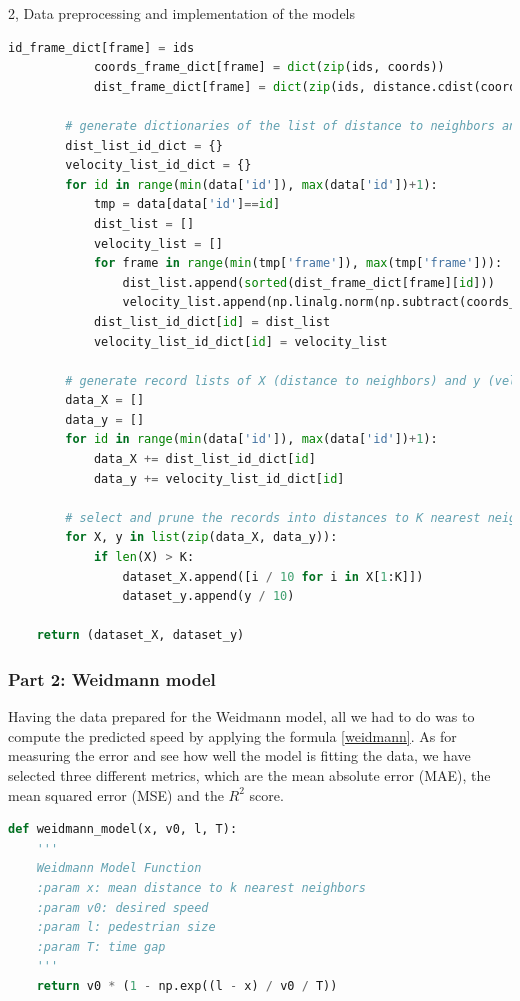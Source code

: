 \documentclass[10pt,a4paper]{article}
\begin{document}
\begin{task}{2, Data preprocessing and implementation of the models}
\begin{lstlisting}[language=Python]
            id_frame_dict[frame] = ids
            coords_frame_dict[frame] = dict(zip(ids, coords))
            dist_frame_dict[frame] = dict(zip(ids, distance.cdist(coords, coords, 'euclidean')))
        
        # generate dictionaries of the list of distance to neighbors and velocity across time frames on each id
        dist_list_id_dict = {}
        velocity_list_id_dict = {}
        for id in range(min(data['id']), max(data['id'])+1):
            tmp = data[data['id']==id]
            dist_list = []
            velocity_list = []
            for frame in range(min(tmp['frame']), max(tmp['frame'])):
                dist_list.append(sorted(dist_frame_dict[frame][id]))
                velocity_list.append(np.linalg.norm(np.subtract(coords_frame_dict[frame][id], coords_frame_dict[frame+1][id])))
            dist_list_id_dict[id] = dist_list
            velocity_list_id_dict[id] = velocity_list

        # generate record lists of X (distance to neighbors) and y (velocity) as the model's input and output
        data_X = []
        data_y = []
        for id in range(min(data['id']), max(data['id'])+1):
            data_X += dist_list_id_dict[id]
            data_y += velocity_list_id_dict[id]

        # select and prune the records into distances to K nearest neighbors
        for X, y in list(zip(data_X, data_y)):
            if len(X) > K:
                dataset_X.append([i / 10 for i in X[1:K]])
                dataset_y.append(y / 10)

    return (dataset_X, dataset_y)
\end{lstlisting}


\subsubsection*{Part 2: Weidmann model}

Having the data prepared for the Weidmann model, all we had to do was to compute the predicted speed by applying the formula \eqref{weidmann}. As for measuring the error and see how well the model is fitting the data, we have selected three different metrics, which are the mean absolute error (MAE), the mean squared error (MSE) and the ${R^2}$ score.


\begin{lstlisting}[language=Python]
def weidmann_model(x, v0, l, T):
    '''
    Weidmann Model Function
    :param x: mean distance to k nearest neighbors
    :param v0: desired speed
    :param l: pedestrian size
    :param T: time gap
    '''
    return v0 * (1 - np.exp((l - x) / v0 / T))
\end{lstlisting}


\end{task}
\end{document}
